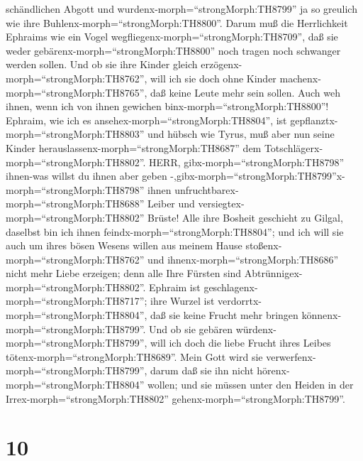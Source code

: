 schändlichen Abgott und wurdenx-morph=``strongMorph:TH8799'' ja so
greulich wie ihre Buhlenx-morph=``strongMorph:TH8800''. 
Darum muß die Herrlichkeit Ephraims wie ein Vogel
wegfliegenx-morph=``strongMorph:TH8709'', daß sie weder
gebärenx-morph=``strongMorph:TH8800'' noch tragen noch schwanger werden
sollen.  Und ob sie ihre Kinder gleich
erzögenx-morph=``strongMorph:TH8762'', will ich sie doch ohne Kinder
machenx-morph=``strongMorph:TH8765'', daß keine Leute mehr sein sollen.
Auch weh ihnen, wenn ich von ihnen gewichen
binx-morph=``strongMorph:TH8800''!  Ephraim, wie ich es
ansehex-morph=``strongMorph:TH8804'', ist
gepflanztx-morph=``strongMorph:TH8803'' und hübsch wie Tyrus, muß aber
nun seine Kinder herauslassenx-morph=``strongMorph:TH8687'' dem
Totschlägerx-morph=``strongMorph:TH8802''.  HERR,
gibx-morph=``strongMorph:TH8798'' ihnen-was willst du ihnen aber geben
-,gibx-morph=``strongMorph:TH8799''x-morph=``strongMorph:TH8798'' ihnen
unfruchtbarex-morph=``strongMorph:TH8688'' Leiber und
versiegtex-morph=``strongMorph:TH8802'' Brüste!  Alle ihre
Bosheit geschieht zu Gilgal, daselbst bin ich ihnen
feindx-morph=``strongMorph:TH8804''; und ich will sie auch um ihres
bösen Wesens willen aus meinem Hause
stoßenx-morph=``strongMorph:TH8762'' und
ihnenx-morph=``strongMorph:TH8686'' nicht mehr Liebe erzeigen; denn alle
Ihre Fürsten sind Abtrünnigex-morph=``strongMorph:TH8802''.
 Ephraim ist geschlagenx-morph=``strongMorph:TH8717''; ihre
Wurzel ist verdorrtx-morph=``strongMorph:TH8804'', daß sie keine Frucht
mehr bringen könnenx-morph=``strongMorph:TH8799''. Und ob sie gebären
würdenx-morph=``strongMorph:TH8799'', will ich doch die liebe Frucht
ihres Leibes tötenx-morph=``strongMorph:TH8689''.  Mein
Gott wird sie verwerfenx-morph=``strongMorph:TH8799'', darum daß sie ihn
nicht hörenx-morph=``strongMorph:TH8804'' wollen; und sie müssen unter
den Heiden in der Irrex-morph=``strongMorph:TH8802''
gehenx-morph=``strongMorph:TH8799''.

\hypertarget{section-9}{%
\section{10}\label{section-9}}

